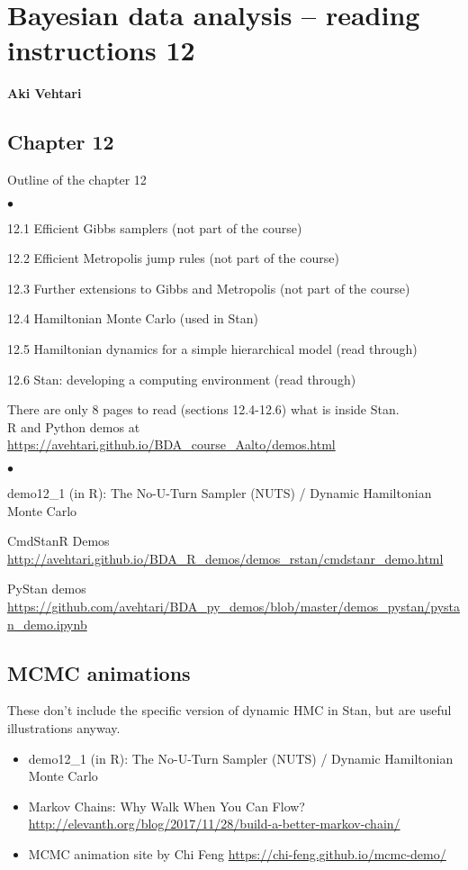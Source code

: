 \documentclass[a4paper,11pt,english]{article}
\begin{document}
\thispagestyle{empty}

\section*{Bayesian data analysis -- reading instructions 12} 
\smallskip
{\bf Aki Vehtari}
\smallskip

\subsection*{Chapter 12}

Outline of the chapter 12
\begin{list}{$\bullet$}{\parsep=0pt\itemsep=2pt}
\item {\color{gray}12.1 Efficient Gibbs samplers (not part of the course)}
\item {\color{gray}12.2 Efficient Metropolis jump rules (not part of the course)}
\item {\color{gray}12.3 Further extensions to Gibbs and Metropolis (not part of the course)}
\item 12.4 Hamiltonian Monte Carlo (used in Stan)
\item 12.5 Hamiltonian dynamics for a simple hierarchical model (read through)
\item 12.6 Stan: developing a computing environment (read through)
\end{list}

\noindent
There are only 8 pages to read (sections 12.4-12.6) what is inside Stan.\\


\noindent
R and Python demos at \url{https://avehtari.github.io/BDA_course_Aalto/demos.html}
\begin{list}{$\bullet$}{\parsep=0pt\itemsep=2pt}
\item demo12\_1 (in R): The No-U-Turn Sampler (NUTS) / Dynamic Hamiltonian Monte Carlo
\item CmdStanR Demos \url{http://avehtari.github.io/BDA_R_demos/demos_rstan/cmdstanr_demo.html}
\item PyStan demos \url{https://github.com/avehtari/BDA_py_demos/blob/master/demos_pystan/pystan_demo.ipynb}
\end{list}


\subsection*{MCMC animations}

These don't include the specific version of dynamic HMC in Stan, but are useful illustrations anyway.
 \begin{itemize}
\item demo12\_1 (in R): The No-U-Turn Sampler (NUTS) / Dynamic Hamiltonian Monte Carlo
 \item Markov Chains: Why Walk When You Can Flow?\\ \url{http://elevanth.org/blog/2017/11/28/build-a-better-markov-chain/}
 \item MCMC animation site by Chi Feng \url{https://chi-feng.github.io/mcmc-demo/}
 \end{itemize}
\end{document}
